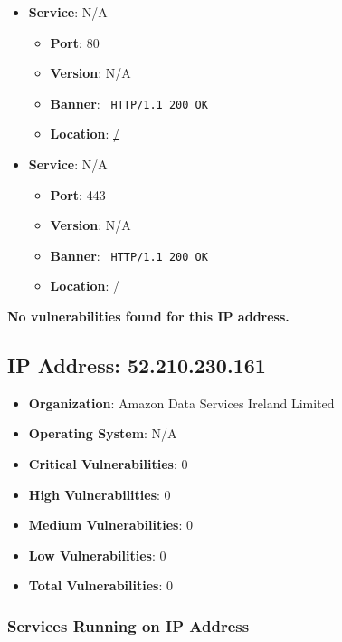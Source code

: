 \documentclass{article}
\begin{document}
\begin{itemize}
    
        \item \textbf{Service}: N/A
        \begin{itemize}
            \item \textbf{Port}: 80
            \item \textbf{Version}:  N/A 
            \item \textbf{Banner}: \texttt{ HTTP/1.1 200 OK
 }
            \item \textbf{Location}: \href{ / }{ / }
        \end{itemize}
    
        \item \textbf{Service}: N/A
        \begin{itemize}
            \item \textbf{Port}: 443
            \item \textbf{Version}:  N/A 
            \item \textbf{Banner}: \texttt{ HTTP/1.1 200 OK
 }
            \item \textbf{Location}: \href{ / }{ / }
        \end{itemize}
    
\end{itemize}


\textbf{No vulnerabilities found for this IP address.}


\clearpage



\subsection*{IP Address: 52.210.230.161}

\begin{itemize}
    \item \textbf{Organization}: Amazon Data Services Ireland Limited
    \item \textbf{Operating System}:  N/A 
    \item \textbf{Critical Vulnerabilities}: 0
    \item \textbf{High Vulnerabilities}: 0
    \item \textbf{Medium Vulnerabilities}: 0
    \item \textbf{Low Vulnerabilities}: 0
    \item \textbf{Total Vulnerabilities}: 0
\end{itemize}

\subsubsection*{Services Running on IP Address}
\end{document}
